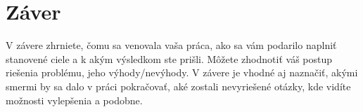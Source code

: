 \chapter{Záver}

V závere zhrniete, čomu sa venovala vaša práca, ako sa vám podarilo naplniť stanovené ciele a k akým výsledkom ste prišli. Môžete zhodnotiť váš postup riešenia problému, jeho výhody/nevýhody. V závere je vhodné aj naznačiť, akými smermi by sa dalo v práci pokračovať, aké zostali nevyriešené otázky, kde vidíte možnosti vylepšenia a podobne.
